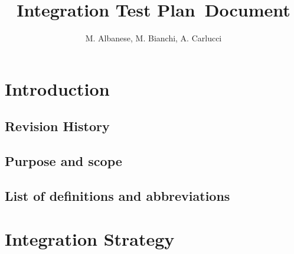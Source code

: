 \documentclass[a4paper, 11pt]{article}
\newcounter{tc}
\begin{document}
\newcommand{\testx}[7]{
	\stepcounter{tc}
	\subsection{Test \thetc: #1} %
	
	\begin{tabular}{l p{0.7\textwidth}}
    \hline
    \textbf{Test Case Identifier} & \thetc\\
    \hline
    \textbf{Test Item(s)} & #2 $\rightarrow$ #3\\
    \hline
    \textbf{Input Specification} & #4\\
    \hline
    \textbf{Output Specification} & #5\\
    \hline
    \textbf{Environmental Needs} & #6\\
    \hline
    \textbf{Test Description} & #7\\
    \hline
	\end{tabular}

}


\title{Integration Test Plan Document}

\author{M. Albanese, M. Bianchi, A. Carlucci}

\maketitle
\newpage{}
\tableofcontents{}

\newpage{}

\section{Introduction}
\subsection{Revision History} 
\label{sub:revision_history}

\subsection{Purpose and scope} 
\label{sub:purpose_and_scope}

\subsection{List of definitions and abbreviations} 
\label{sub:list_of_definitions_and_abbreviations}

\section{Integration Strategy} 
\label{sec:integration_strategy}
\end{document}
